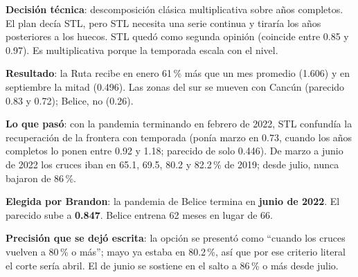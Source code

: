 \begin{opciones}
\textbf{Decisión técnica}: descomposición clásica multiplicativa sobre años completos. El plan decía STL, pero STL necesita
una serie continua y tiraría los años posteriores a los huecos. STL quedó como segunda opinión (coincide entre 0.85 y
0.97). Es multiplicativa porque la temporada escala con el nivel.

\textbf{Resultado}: la Ruta recibe en enero 61\,\% más que un mes promedio (1.606) y en septiembre la mitad (0.496). Las zonas
del sur se mueven con Cancún (parecido 0.83 y 0.72); Belice, no (0.26).
\end{opciones}

\begin{opciones}
\textbf{Lo que pasó}: con la pandemia terminando en febrero de 2022, STL confundía la recuperación de la frontera con
temporada (ponía marzo en 0.73, cuando los años completos lo ponen entre 0.92 y 1.18; parecido de solo 0.446). De marzo a
junio de 2022 los cruces iban en 65.1, 69.5, 80.2 y 82.2\,\% de 2019; desde julio, nunca bajaron de 86\,\%.

\textbf{Elegida por Brandon}: la pandemia de Belice termina en \textbf{junio de 2022}. El parecido sube a \textbf{0.847}.
Belice entrena 62 meses en lugar de 66.

\textbf{Precisión que se dejó escrita}: la opción se presentó como ``cuando los cruces vuelven a 80\,\% o más''; mayo ya
estaba en 80.2\,\%, así que por ese criterio literal el corte sería abril. El de junio se sostiene en el salto a 86\,\% o
más desde julio.
\end{opciones}

